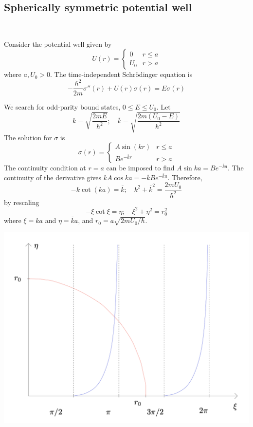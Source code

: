 \documentclass[a4paper,11pt]{article}
\begin{document}
\subsection{Spherically symmetric potential well}\ \vspace{-1.5em}
\begin{example}
	Consider the potential well given by
\[
	U(r) = \begin{cases}
		0   & r \leq a \\
		U_0 & r > a
	\end{cases}
\]
where \( a, U_0 > 0 \).
The time-independent Schr\"odinger equation is
\[
	-\frac{\hbar^2}{2m} \sigma''(r) + U(r) \sigma(r) = E \sigma(r)
\]
\end{example}
We search for odd-parity bound states, \( 0 \le E \le U_0 \).
Let
\[
	k = \sqrt{\frac{2mE}{\hbar^2}};\quad \overline k = \sqrt{\frac{2m(U_0 - E)}{\hbar^2}}
\]
The solution for \( \sigma \) is
\[
	\sigma(r) = \begin{cases}
		A \sin(kr)           & r \leq a \\
		B e^{-\overline k r} & r > a
	\end{cases}
\]
The continuity condition at \( r = a \) can be imposed to find \( A \sin ka = B e^{-\overline k a} \).
The continuity of the derivative gives \( kA \cos ka = -\overline k B e^{-\overline k a} \).
Therefore,
\[
	-k \cot(ka) = \overline k;\quad k^2 + \overline k^2 = \frac{2mU_0}{\hbar^2}
\]
by rescaling
\[
	-\xi \cot \xi = \eta; \quad \xi^2 + \eta^2 = r_0^2
\]
where \( \xi = ka \) and \( \eta = \overline k a \), and \( r_0 = a\sqrt{2mU_0/\hbar} \).
\begin{center}
	\includegraphics[scale=0.22]{qm12.png}
\end{center}
\end{document}
